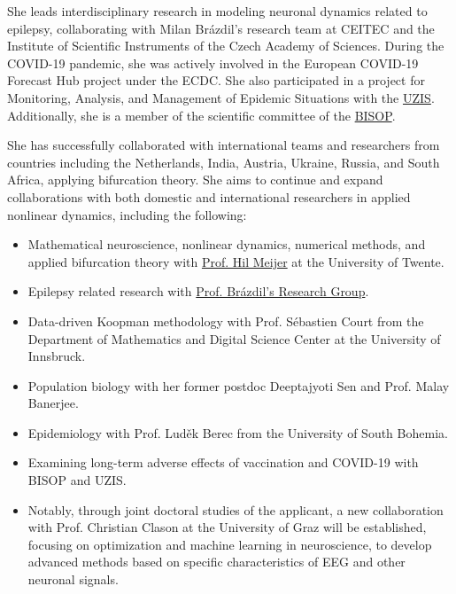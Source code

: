 \documentclass[a4paper,11pt]{scrartcl}
\begin{document}
She leads interdisciplinary research in modeling neuronal dynamics related to epilepsy, collaborating with Milan Brázdil's research team at CEITEC and the Institute of Scientific Instruments of the Czech Academy of Sciences. During the COVID-19 pandemic, she was actively involved in the European COVID-19 Forecast Hub project under the \Ac{ECDC}. She also participated in a project for Monitoring, Analysis, and Management of Epidemic Situations with the \href{https://www.uzis.cz/}{\Ac{UZIS}}. Additionally, she is a member of the scientific committee of the \href{https://www.bisop.eu/}{\Ac{BISOP}}.

She has successfully collaborated with international teams and researchers from countries including the Netherlands, India, Austria, Ukraine, Russia, and South Africa, applying bifurcation theory. She aims to continue and expand collaborations with both domestic and international researchers in applied nonlinear dynamics, including the following:

\begin{itemize}
    \item Mathematical neuroscience, nonlinear dynamics, numerical methods, and applied bifurcation theory with \href{https://people.utwente.nl/h.g.e.meijer}{Prof. Hil Meijer} at the University of Twente.
    \item Epilepsy related research with \href{https://www.muni.cz/en/about-us/organizational-structure/ceitec/714004-milan-brazdil-rg}{Prof. Brázdil's Research Group}.
    \item Data-driven Koopman methodology with Prof. Sébastien Court from the Department of Mathematics and Digital Science Center at the University of Innsbruck.
    \item Population biology with her former postdoc Deeptajyoti Sen and Prof. Malay Banerjee.
    \item Epidemiology with Prof. Luděk Berec from the University of South Bohemia.
    \item Examining long-term adverse effects of vaccination and COVID-19 with \ac{BISOP} and \ac{UZIS}.
    \item Notably, through joint doctoral studies of the applicant, a new collaboration with Prof. Christian Clason at the University of Graz will be established, focusing on optimization and machine learning in neuroscience, to develop advanced methods based on specific  characteristics of \ac{EEG} and other neuronal signals. 
\end{itemize}
\end{document}
